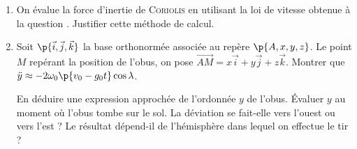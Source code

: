 \documentclass[a4paper,french,bookmarks]{article}
\begin{document}
\begin{enumerate}[resume]
\begin{enumerate}
            \item On évalue la force d'inertie de \textsc{Coriolis} en utilisant la loi de vitesse obtenue à la question .
            Justifier cette méthode de calcul.
            
            \noafter
            \nobefore\yesafter
            \yesbefore
            

            \item\label{qu:I.2.3} Soit $\p{\vec i, \vec j, \vec k}$ la base orthonormée associée au repère $\p{A, x, y, z}$. Le point $M$ repérant la position de l'obus, on pose $\vec{AM} = x\vec i + y\vec j + z\vec k$. Montrer que $\ddot y \approx -2\omega_0\p{v_0 - g_0t}\cos \lambda$.

            En déduire une expression approchée de l'ordonnée $y$ de l'obus. Évaluer $y$ au moment où l'obus tombe sur le sol. La déviation se fait-elle vers l'ouest ou vers l'est ? Le résultat dépend-il de l'hémisphère dans lequel on effectue le tir ?
            

\end{enumerate}
\end{enumerate}
\end{document}
